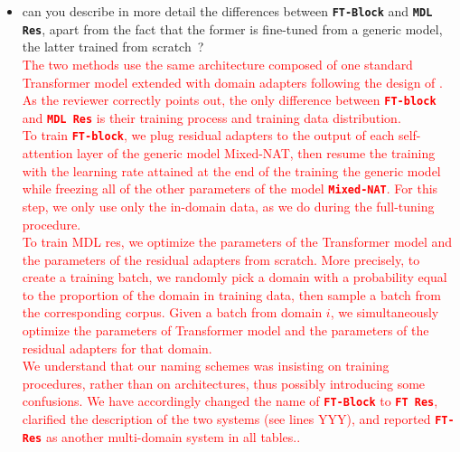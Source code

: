 \documentclass[12pt,times,a4paper,twoside]{article}
\newcommand{\fyTodo}[1]{\Todo[FY:]{\textcolor{orange}{#1}}}
\newcommand{\fyDone}[1]{\done[FY]\Todo[FY:]{\textcolor{orange}{#1}}}
\theoremstyle{definition}
\newcommand{\system}[1]{\texttt{\textbf{#1}}}
\begin{document}
\begin{itemize}
\item can you describe in more detail the differences between \system{FT-Block} and \system{MDL Res}, apart from the fact that the former is fine-tuned from a generic model, the latter trained from scratch~?
  \\
  \textcolor{red}{%
    The two methods use the same architecture composed of one standard Transformer model extended with domain adapters following the design of \cite{Bapna19simple}. As the reviewer correctly points out, the only difference between \system{FT-block} and \system{MDL Res} is their training process and training data distribution.
    \\
    To train \system{FT-block}, we plug residual adapters to the output of each self-attention layer of the generic model Mixed-NAT, then resume the training with the learning rate attained at the end of the training the generic model while freezing all of the other parameters of the model \system{Mixed-NAT}. For this step, we only use only the in-domain data, as we do during the full-tuning procedure.
    \\
    To train MDL res, we optimize the parameters of the Transformer model and the parameters of the residual adapters from scratch. More precisely, to create a training batch, we randomly pick a domain with a probability equal to the proportion of the domain in training data, then sample a batch from the corresponding corpus. Given a batch from domain $i$, we simultaneously optimize the parameters of Transformer model and the parameters of the residual adapters for that domain.
    \\
    We understand that our naming schemes was insisting on training procedures, rather than on architectures, thus possibly introducing some confusions. We have accordingly changed the name of \system{FT-Block} to \system{FT Res}, clarified the description of the two systems (see lines YYY\fyTodo{fix this}), and reported \system{FT-Res}\fyDone{or new name} as another multi-domain system in all tables.\fyTodo{Make sure it is the case}.}
\end{itemize}
\end{document}
